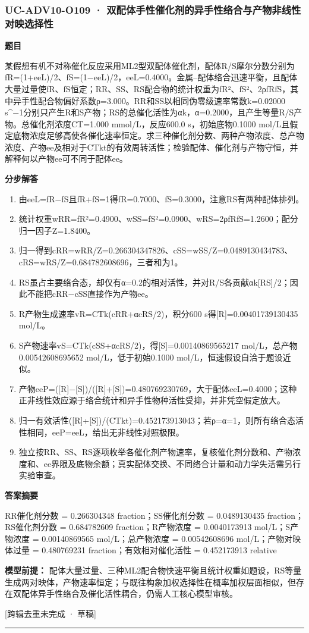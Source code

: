 \documentclass[UTF8,11pt,a4paper]{ctexart}
\begin{document}
\subsubsection*{UC-ADV10-O109 · 双配体手性催化剂的异手性络合与产物非线性对映选择性}
\noindent\textbf{题目}\par
某假想有机不对称催化反应采用ML2型双配体催化剂，配体R/S摩尔分数分别为fR=(1+eeL)/2、fS=(1−eeL)/2，eeL=0.4000。金属–配体络合迅速平衡，且配体大量过量使fR、fS恒定；RR、SS、RS配合物的统计权重为fR²、fS²、2ρfRfS，其中异手性配合物偏好系数ρ=3.000。RR和SS以相同伪零级速率常数k=0.02000 s\textasciicircum{}−1分别只产生R和S产物；RS的总催化活性为αk，α=0.2000，且产生等量R/S产物。总催化剂浓度CT=1.000 mmol/L，反应600.0 s，初始底物0.1000 mol/L且假定底物浓度足够高使各催化速率恒定。求三种催化剂分数、两种产物浓度、总产物浓度、产物ee及相对于CTkt的有效周转活性；检验配体、催化剂与产物守恒，并解释何以产物ee可不同于配体ee。\par
\medskip\noindent\textbf{分步解答}
\begin{enumerate}
\item 由eeL=fR−fS且fR+fS=1得fR=0.7000、fS=0.3000，注意RS有两种配体排列。
\item 统计权重wRR=fR²=0.4900、wSS=fS²=0.0900、wRS=2ρfRfS=1.2600；配分归一因子Z=1.8400。
\item 归一得到cRR=wRR/Z=0.266304347826、cSS=wSS/Z=0.0489130434783、cRS=wRS/Z=0.684782608696，三者和为1。
\item RS虽占主要络合态，却仅有α=0.2的相对活性，并对R/S各贡献αk[RS]/2；因此不能把cRR−cSS直接作为产物ee。
\item R产物生成速率vR=CTk(cRR+αcRS/2)，积分600 s得[R]=0.00401739130435 mol/L。
\item S产物速率vS=CTk(cSS+αcRS/2)，得[S]=0.00140869565217 mol/L，总产物0.00542608695652 mol/L，低于初始0.1000 mol/L，恒速假设自洽于题设近似。
\item 产物eeP=([R]−[S])/([R]+[S])=0.480769230769，大于配体eeL=0.4000；这种正非线性效应源于络合统计和异手性物种活性受抑，并非凭空假定放大。
\item 归一有效活性([R]+[S])/(CTkt)=0.452173913043；若ρ=α=1，则所有络合态活性相同，eeP=eeL，给出无非线性对照极限。
\item 独立按RR、SS、RS逐项枚举各催化剂产物速率，复核催化剂分数和、产物浓度和、ee界限及底物余额；真实配体交换、不同络合计量和动力学失活需另行实验审查。
\end{enumerate}
\noindent\textbf{答案摘要}\par
RR催化剂分数 = 0.266304348 fraction；SS催化剂分数 = 0.0489130435 fraction；RS催化剂分数 = 0.684782609 fraction；R产物浓度 = 0.0040173913 mol/L；S产物浓度 = 0.00140869565 mol/L；总产物浓度 = 0.00542608696 mol/L；产物对映体过量 = 0.480769231 fraction；有效相对催化活性 = 0.452173913 relative\par
\noindent\textbf{模型前提：}
配体大量过量、三种ML2配合物快速平衡且统计权重如题设，RS等量生成两对映体，产物速率恒定；与既往构象加权选择性在概率加权层面相似，但存在双配体异手性络合及催化活性耦合，仍需人工核心模型审核。\par
\noindent\textcolor{red!65!black}{[跨辑去重未完成 · 草稿]} \par
\medskip\hrule\medskip
{}
\end{document}
